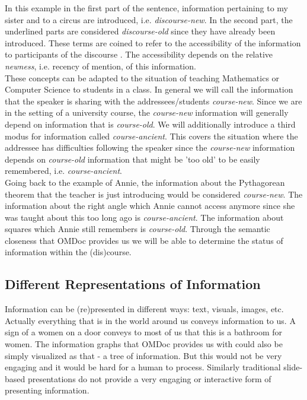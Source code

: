 \documentclass[twoside]{article}
\begin{document}
In this example in the first part of the sentence, information pertaining to my sister and to a circus are introduced, i.e. \textit{discourse-new}. In the second part, the underlined parts are considered \textit{discourse-old} since they have already been introduced. These terms are coined to refer to the accessibility of the information to participants of the discourse \cite{Newness:npentrel14}. The accessibility depends on the relative \textit{newness}, i.e. recency of mention, of this information.\\

These concepts can be adapted to the situation of teaching Mathematics or Computer Science to students in a class. In general we will call the information that the speaker is sharing with the addressees/students \textit{course-new}. Since we are in the setting of a university course, the \textit{course-new} information will generally depend on information that is \textit{course-old}. We will additionally introduce a third modus for information called \textit{course-ancient}. This covers the situation where the addressee has difficulties following the speaker since the \textit{course-new} information depends on \textit{course-old} information that might be 'too old' to be easily remembered, i.e. \textit{course-ancient}.\\

Going back to the example of Annie, the information about the Pythagorean theorem that the teacher is just introducing would be considered \textit{course-new}. The information about the right angle which Annie cannot access anymore since she was taught about this too long ago is \textit{course-ancient}. The information about squares which Annie still remembers is \textit{course-old}. Through the semantic closeness that OMDoc provides us we will be able to determine the status of information within the (dis)course. \\

\subsection{Different Representations of Information}
\label{sec:inforep}

Information can be (re)presented in different ways: text, visuals, images, etc. Actually everything that is in the world around us conveys information to us. A sign of a women on a door conveys to most of us that this is a bathroom for women. The information graphs that OMDoc provides us with could also be simply visualized as that - a tree of information. But this would not be very engaging and it would be hard for a human to process. Similarly traditional slide-based presentations do not provide a very engaging or interactive form of presenting information. \\  
\end{document}
